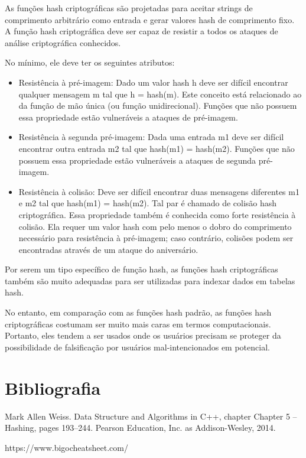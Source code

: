 \documentclass[a4paper, 12pt]{article}
\begin{document}
	As funções hash criptográficas são projetadas para aceitar strings de comprimento arbitrário como entrada e gerar valores hash de comprimento fixo. A função hash criptográfica deve ser capaz de resistir a todos os ataques de análise criptográfica conhecidos. 
	
	 No mínimo, ele deve ter os seguintes atributos: 
	  \begin{itemize}
	 	\item Resistência à pré-imagem:
	 	Dado um valor hash h deve ser difícil encontrar qualquer mensagem m tal que h = hash(m). Este conceito está relacionado ao da função de mão única (ou função unidirecional). Funções que não possuem essa propriedade estão vulneráveis a ataques de pré-imagem.
	 	\item Resistência à segunda pré-imagem:
	 	Dada uma entrada m1 deve ser difícil encontrar outra entrada m2 tal que hash(m1) = hash(m2). Funções que não possuem essa propriedade estão vulneráveis a ataques de segunda pré-imagem.
	 	\item Resistência à colisão:
	 	Deve ser difícil encontrar duas mensagens diferentes m1 e m2 tal que hash(m1) = hash(m2). Tal par é chamado de colisão hash criptográfica. Essa propriedade também é conhecida como forte resistência à colisão. Ela requer um valor hash com pelo menos o dobro do comprimento necessário para resistência à pré-imagem; caso contrário, colisões podem ser encontradas através de um ataque do aniversário.
	 \end{itemize}
	  
	  
	  Por serem um tipo específico de função hash, as funções hash criptográficas também são muito adequadas para ser utilizadas para indexar dados em tabelas hash.
	
	  No entanto, em comparação com as funções hash padrão, as funções hash criptográficas costumam ser muito mais caras em termos computacionais. Portanto, eles tendem a ser 
	usados onde os usuários precisam se proteger
	   da possibilidade de falsificação por usuários mal-intencionados em potencial.
	  
	\newpage

	
	\section*{Bibliografia}

\footnotesize{
	\noindent Mark Allen Weiss. Data Structure and Algorithms in C++, chapter Chapter 5 – Hashing, pages 193–244. Pearson Education, Inc. as Addison-Wesley, 2014.\\

}
\footnotesize{
	
	\noindent https://www.bigocheatsheet.com/\\
	
}
\end{document}
